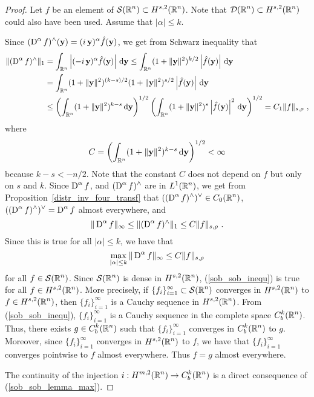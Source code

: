 \begin{proof}
Let $f$ be an element of $\displaystyle \mathcal{S}(\mathbb{R}^n) \subset H^{s,2}(\mathbb{R}^n)$.
Note that $\displaystyle \mathcal{D}(\mathbb{R}^n) \subset H^{s,2}(\mathbb{R}^n)$ could also
have been used.  Assume that $|\alpha|\leq k$.

Since $\displaystyle (\operatorname{D}^\alpha f)^\wedge(\mathbf{y}) =
(i\,\mathbf{y})^\alpha \hat{f}(\mathbf{y})$, we get from Schwarz
inequality that
\begin{align*}
\| (\operatorname{D}^\alpha f)^\wedge \|_1 &= 
\int_{\mathbb{R}^n} \left| (-i\,\mathbf{y})^\alpha \hat{f}(\mathbf{y}) \right| \,\mathrm{d}{\mathbf{y}}
\leq \int_{\mathbb{R}^n} (1+\|\mathbf{y}\|^2)^{k/2} \left| \hat{f}(\mathbf{y}) \right|
\,\mathrm{d}{\mathbf{y}} \\
& =\int_{\mathbb{R}^n} (1+\|\mathbf{y}\|^2)^{(k-s)/2}
 (1+\|\mathbf{y}\|^2)^{s/2} \left| \hat{f}(\mathbf{y}) \right| \,\mathrm{d}{\mathbf{y}} \\
&\leq \left( \int_{\mathbb{R}^n} (1+\|\mathbf{y}\|^2)^{k-s} \,\mathrm{d}{\mathbf{y}} \right)^{1/2}
\left(\int_{\mathbb{R}^n} (1+\|\mathbf{y}\|^2)^s \left|\hat{f}(\mathbf{y}) \right|^2
\,\mathrm{d}{\mathbf{y}}\right)^{1/2}
= C_1 \| f \|_{s,\rho} \ ,
\end{align*}
where
\[
C = \left( \int_{\mathbb{R}^n} (1+\|\mathbf{y}\|^2)^{k-s} \,\mathrm{d}{\mathbf{y}} \right)^{1/2}
< \infty
\]
because $k-s < -n/2$.  Note that the constant $C$ does not depend on
$f$ but only on $s$ and $k$.  Since $\displaystyle \operatorname{D}^\alpha f$, and
$\displaystyle (\operatorname{D}^\alpha f)^\wedge$ are in
$\displaystyle L^1(\mathbb{R}^n)$, we
get from Proposition~\ref{distr_inv_four_transf} that
$\displaystyle ((\operatorname{D}^\alpha f)^\wedge)^\vee \in C_0(\mathbb{R}^n)$,
$\displaystyle ((\operatorname{D}^\alpha f)^\wedge)^\vee = \operatorname{D}^\alpha f$ almost
everywhere, and
\[
  \|\operatorname{D}^\alpha f\|_\infty \leq \|(\operatorname{D}^\alpha f)^\wedge \|_1
  \leq C \| f \|_{s,\rho} \ .
\]
Since this is true for all $|\alpha|\leq k$, we have
that
\begin{equation}\label{sob_sob_inequ}
\max_{|\alpha|\leq k} \|\operatorname{D}^\alpha f\|_{\infty} \leq C \| f \|_{s,\rho}
\end{equation}
for all $\displaystyle f \in \mathcal{S}(\mathbb{R}^n)$.  Since
$\displaystyle \mathcal{S}(\mathbb{R}^n)$ is dense in
$\displaystyle H^{s,2}(\mathbb{R}^n)$, (\ref{sob_sob_inequ}) is true for all
$\displaystyle f \in H^{s,2}(\mathbb{R}^n)$.  More precisely, if
$\displaystyle \{f_i\}_{i=1}^\infty \subset \mathcal{S}(\mathbb{R}^n)$ converges in
$\displaystyle H^{s,2}(\mathbb{R}^n)$ to $\displaystyle f \in H^{s,2}(\mathbb{R}^n)$, then
$\displaystyle \{f_i\}_{i=1}^\infty$ is a Cauchy sequence in
$\displaystyle H^{s,2}(\mathbb{R}^n)$.
From (\ref{sob_sob_inequ}), $\displaystyle \{f_i\}_{i=1}^\infty$ is a Cauchy
sequence in the complete space $\displaystyle C_b^k(\mathbb{R}^n)$.  Thus, there exists
$\displaystyle g \in C_b^k(\mathbb{R}^n)$ such that
$\displaystyle \{f_i\}_{i=1}^\infty$ converges in
$\displaystyle C_b^k(\mathbb{R}^n)$ to $g$.  Moreover, since
$\displaystyle \{f_i\}_{i=1}^\infty $ converges in
$\displaystyle H^{s,2}(\mathbb{R}^n)$ to $f$, we have
that $\displaystyle \{f_i\}_{i=1}^\infty $ converges pointwise to $f$ almost
everywhere.  Thus $f = g$ almost everywhere.

The continuity of the injection
$\displaystyle i:H^{m,2}(\mathbb{R}^n) \to C_b^k(\mathbb{R}^n)$ is a direct
consequence of (\ref{sob_sob_lemma_max}).
\end{proof}

